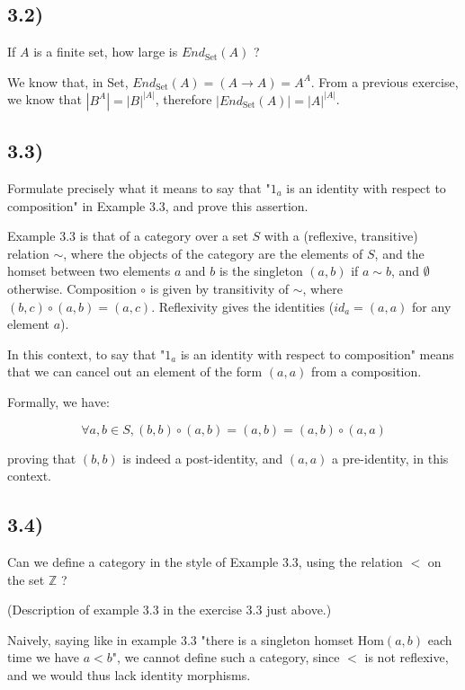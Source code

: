 \subsection*{3.2)}

If $A$ is a finite set, how large is $End_{\text{Set}}(A)$ ?

We know that, in Set, $End_{\text{Set}}(A) = (A \to A) = A^A$. From a previous exercise, we know that $|B^A| = |B|^{|A|}$, therefore $|End_{\text{Set}}(A)| = |A|^{|A|}$.



\subsection*{3.3)}

Formulate precisely what it means to say that "$1_a$ is an identity with respect to composition" in Example 3.3, and prove this assertion.

Example 3.3 is that of a category over a set $S$ with a (reflexive, transitive) relation $\sim$, where the objects of the category are the elements of $S$, and the homset between two elements $a$ and $b$ is the singleton $(a,b)$ if $a \sim b$, and $\emptyset$ otherwise. Composition $\circ$ is given by transitivity of $\sim$, where $(b,c) \circ (a,b) = (a,c)$. Reflexivity gives the identities ($id_a = (a,a)$ for any element $a$).

In this context, to say that "$1_a$ is an identity with respect to composition" means that we can cancel out an element of the form $(a,a)$ from a composition.

Formally, we have:

$$\forall a,b \in S, (b,b) \circ (a,b) = (a,b) = (a,b) \circ (a,a)$$

proving that $(b,b)$ is indeed a post-identity, and $(a,a)$ a pre-identity, in this context.



\subsection*{3.4)}

Can we define a category in the style of Example 3.3, using the relation $<$ on the set $\mathbb{Z}$ ?

(Description of example 3.3 in the exercise 3.3 just above.)

Naively, saying like in example 3.3 "there is a singleton homset $\text{Hom}(a,b)$ each time we have $a < b$", we cannot define such a category, since $<$ is not reflexive, and we would thus lack identity morphisms.

